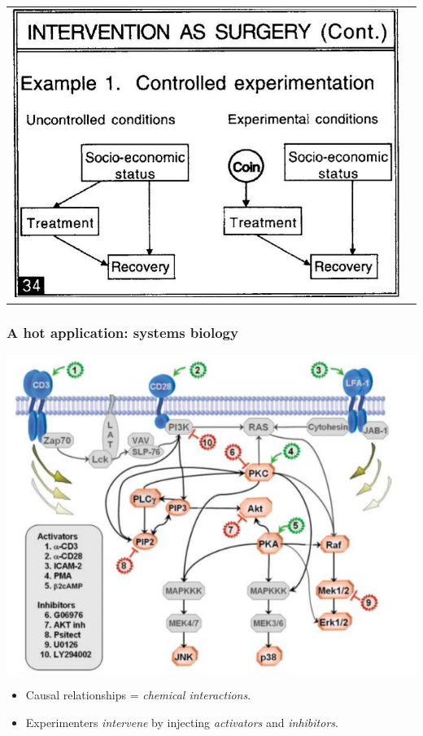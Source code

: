 \documentclass{beamer}
\begin{document}
\begin{frame}
\begin{tabular}{cc}
\includegraphics[scale=0.25]{../images/pearl34.png}
\end{tabular}
\end{frame}

\begin{frame}
\frametitle{A hot application: systems biology}
\begin{center}
\includegraphics[scale=0.3]{../images/cyto_graph.png}
\end{center}
\begin{itemize}
\item Causal relationships = \emph{chemical interactions}.
\item Experimenters \emph{intervene} by injecting \emph{activators} and \emph{inhibitors}.
\end{itemize}
\end{frame}
\end{document}
